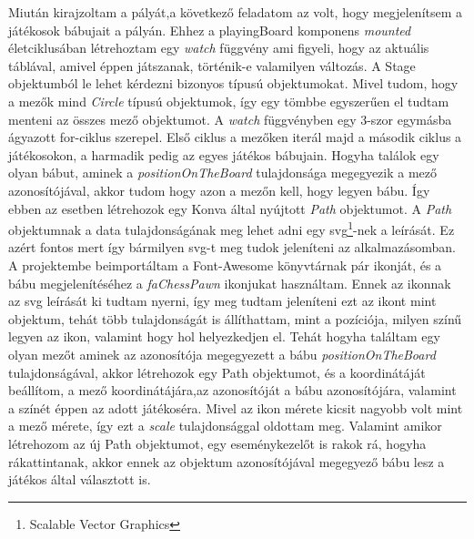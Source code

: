\documentclass[a4paper,twoside]{article}
\begin{document}
Miután kirajzoltam a pályát,a következő feladatom az volt, hogy megjelenítsem a játékosok bábujait a pályán. Ehhez a playingBoard komponens \textit{mounted} életciklusában létrehoztam egy \textit{watch} függvény ami figyeli, hogy az aktuális táblával, amivel éppen játszanak, történik-e valamilyen változás. A Stage objektumból le lehet kérdezni bizonyos típusú objektumokat. Mivel tudom, hogy a mezők mind \textit{Circle} típusú objektumok, így egy tömbbe egyszerűen el tudtam menteni az összes mező objektumot. A \textit{watch} függvényben egy 3-szor egymásba ágyazott for-ciklus szerepel. Első ciklus a mezőken iterál majd a második ciklus a játékosokon, a harmadik pedig az egyes játékos bábujain. Hogyha találok egy olyan bábut, aminek a \textit{positionOnTheBoard} tulajdonsága megegyezik a mező azonosítójával, akkor tudom hogy azon a mezőn kell, hogy legyen bábu. Így ebben az esetben létrehozok egy Konva által nyújtott \textit{Path} objektumot. A \textit{Path} objektumnak a data tulajdonságának meg lehet adni egy svg\footnote{Scalable Vector Graphics}-nek a leírását. Ez azért fontos mert így bármilyen svg-t meg tudok jeleníteni az alkalmazásomban. A projektembe beimportáltam a Font-Awesome könyvtárnak pár ikonját, és a bábu megjelenítéséhez a \textit{faChessPawn} ikonjukat használtam. Ennek az ikonnak az svg leírását ki tudtam nyerni, így meg tudtam jeleníteni ezt az ikont mint objektum, tehát több tulajdonságát is állíthattam, mint a pozíciója, milyen színű legyen az ikon, valamint hogy hol helyezkedjen el. Tehát hogyha találtam egy olyan mezőt aminek az azonosítója megegyezett a bábu \textit{positionOnTheBoard} tulajdonságával, akkor létrehozok egy Path objektumot, és a koordinátáját beállítom, a mező koordinátájára,az azonosítóját a bábu azonosítójára, valamint a színét éppen az adott játékoséra. Mivel az ikon mérete kicsit nagyobb volt mint a mező mérete, így ezt a \textit{scale} tulajdonsággal oldottam meg. Valamint amikor létrehozom az új Path objektumot, egy eseménykezelőt is rakok rá, hogyha rákattintanak, akkor ennek az objektum azonosítójával megegyező bábu lesz a játékos által választott is. 
\end{document}
